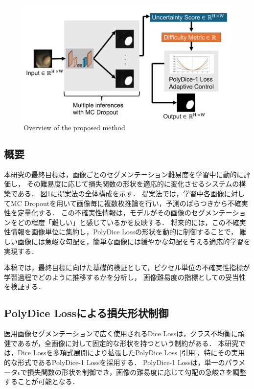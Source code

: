 \documentclass[10pt, a4paper, twocolumn]{jarticle}
\begin{document}
\begin{figure}
  \includegraphics[width=\columnwidth]{figure/method.pdf}
  \caption{Overview of the proposed method}
  \label{method}
\end{figure}

\subsection{概要}
本研究の最終目標は，画像ごとのセグメンテーション難易度を学習中に動的に評価し，
その難易度に応じて損失関数の形状を適応的に変化させるシステムの構築である．
図\ref{method}に提案法の全体構成を示す．
提案法では，学習中各画像に対してMC Dropoutを用いて画像毎に複数枚推論を行い，予測のばらつきから不確実性を定量化する．
この不確実性情報は，モデルがその画像のセグメンテーションをどの程度「難しい」と感じているかを反映する．
将来的には，この不確実性情報を画像単位に集約し，PolyDice Lossの形状を動的に制御することで，
難しい画像には急峻な勾配を，簡単な画像には緩やかな勾配を与える適応的学習を実現する．

本稿では，最終目標に向けた基礎的検証として，ピクセル単位の不確実性指標が学習過程でどのように推移するかを分析し，
画像難易度の指標としての妥当性を検証する．

\subsection{PolyDice Loss\cite{polydice}による損失形状制御}
医用画像セグメンテーションで広く使用されるDice Lossは，クラス不均衡に頑健であるが，全画像に対して固定的な形状を持つという制約がある．
本研究では，Dice Lossを多項式展開により拡張したPolyDice Loss [引用]，特にその実用的な形式であるPolyDice-1 Lossを採用する．
PolyDice-1 Lossは，単一のパラメータ$\epsilon$で損失関数の形状を制御でき，画像の難易度に応じて勾配の急峻さを調整することが可能となる．
\end{document}
